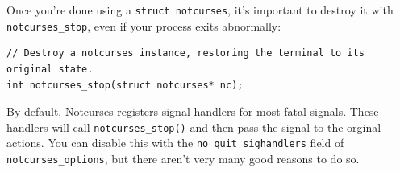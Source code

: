 \documentclass[letterpaper,10pt]{article}
\begin{document}
Once you're done using a \texttt{struct notcurses}, it's important to destroy
it with \texttt{notcurses\_stop}, even if your process exits abnormally:

\begin{listing}[ht]
\begin{verbatim}
// Destroy a notcurses instance, restoring the terminal to its original state.
int notcurses_stop(struct notcurses* nc);
\end{verbatim}
\end{listing}

By default, Notcurses registers signal handlers for most fatal signals. These
handlers will call \texttt{notcurses\_stop()} and then pass the signal to the
orginal actions. You can disable this with the \texttt{no\_quit\_sighandlers}
field of \texttt{notcurses\_options}, but
there aren't very many good reasons to do so.
\end{document}
